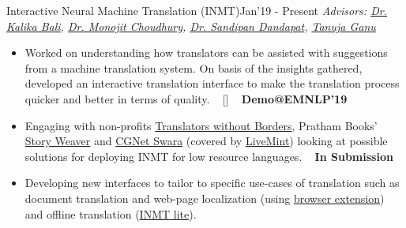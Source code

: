 \begin{projects}

\project
	{Interactive Neural Machine Translation (INMT)}{Jan'19 - Present}
	{
	    \textit{Advisors:  \href{https://www.microsoft.com/en-us/research/people/kalikab/}{Dr. Kalika Bali}, \href{https://www.microsoft.com/en-us/research/people/monojitc/}{Dr. Monojit Choudhury}, \href{https://www.microsoft.com/en-us/research/people/monojitc/}{Dr. Sandipan Dandapat}, \href{https://www.microsoft.com/en-us/research/people/monojitc/}{Tanuja Ganu}}
	}
	{\begin{itemize}
	\setlength\itemsep{0.3em}
     \item Worked on understanding how translators can be assisted with suggestions from a machine translation system. On basis of the insights gathered, developed an interactive translation interface to make the translation process quicker and better in terms of quality. ~ [\href{https://microsoft.github.io/inmt/}{\small{\websiteSymbol}}] ~ {\small{\lbrack\textbf{{Demo@EMNLP'19}}\rbrack}}
     \item Engaging with non-profits \href{https://translatorswithoutborders.org/}{Translators without Borders}, Pratham Books' \href{https://storyweaver.org.in/}{Story Weaver} and \href{http://cgnetswara.org/}{CGNet Swara} (covered by \href{https://www.livemint.com/mint-lounge/features/now-a-unique-machine-translation-tool-from-hindi-to-gondi-11597386377981.html}{LiveMint}) looking at possible solutions for deploying INMT for low resource languages. ~ {\small{\lbrack\textbf{{In Submission}}\rbrack}}
     \item Developing new interfaces to tailor to specific use-cases of translation such as document translation and web-page localization (using \href{github.com/microsoft/inmt-browser}{browser extension}) and offline translation (\href{https://github.com/microsoft/INMT-lite}{INMT lite}).
     \end{itemize}}
     

\end{projects}
